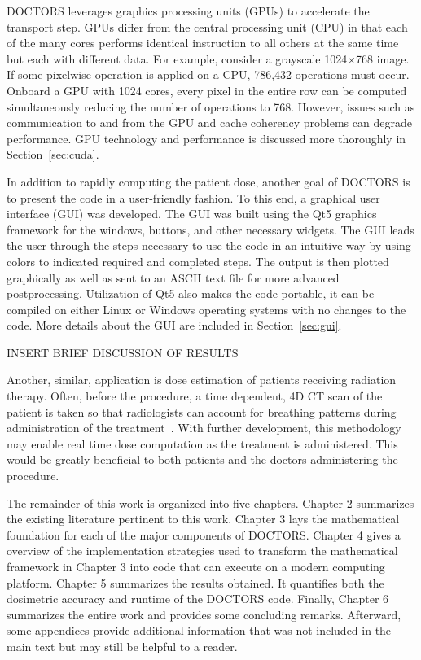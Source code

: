 DOCTORS leverages graphics processing units (GPUs) to accelerate the transport step. GPUs differ from the central processing unit (CPU) in that each of the many cores performs identical instruction to all others at the same time but each with different data. For example, consider a grayscale 1024$\times$768 image. If some pixelwise operation is applied on a CPU, 786,432 operations must occur. Onboard a GPU with 1024 cores, every pixel in the entire row can be computed simultaneously reducing the number of operations to 768. However, issues such as communication to and from the GPU and cache coherency problems can degrade performance. GPU technology and performance is discussed more thoroughly in Section~\ref{sec:cuda}.

In addition to rapidly computing the patient dose, another goal of DOCTORS is to present the code in a user-friendly fashion. To this end, a graphical user interface (GUI) was developed. The GUI was built using the Qt5 graphics framework for the windows, buttons, and other necessary widgets. The GUI leads the user through the steps necessary to use the code in an intuitive way by using colors to indicated required and completed steps. The output is then plotted graphically as well as sent to an ASCII text file for more advanced postprocessing. Utilization of Qt5 also makes the code portable, it can be compiled on either Linux or Windows operating systems with no changes to the code. More details about the GUI are included in Section~\ref{sec:gui}.

INSERT BRIEF DISCUSSION OF RESULTS

Another, similar, application is dose estimation of patients receiving radiation therapy. Often, before the procedure, a time dependent, 4D CT scan of the patient is taken so that radiologists can account for breathing patterns during administration of the treatment~\citep{ref:pant}. With further development, this methodology may enable real time dose computation as the treatment is administered. This would be greatly beneficial to both patients and the doctors administering the procedure.

The remainder of this work is organized into five chapters. Chapter 2 summarizes the existing literature pertinent to this work. Chapter 3 lays the mathematical foundation for each of the major components of DOCTORS. Chapter 4 gives a overview of the implementation strategies used to transform the mathematical framework in Chapter 3 into code that can execute on a modern computing platform. Chapter 5 summarizes the results obtained. It quantifies both the dosimetric accuracy and runtime of the DOCTORS code. Finally, Chapter 6 summarizes the entire work and provides some concluding remarks. Afterward, some appendices provide additional information that was not included in the main text but may still be helpful to a reader. 

\endinput
